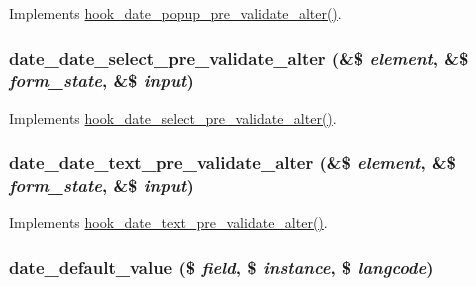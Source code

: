\label{date__elements_8inc_a955d565e21db7029f550ce0f35bda5d2}
Implements \hyperlink{date_8api_8php_ae85363c63f938c6742a67b315e925730}{hook\_\-date\_\-popup\_\-pre\_\-validate\_\-alter()}. \hypertarget{date__elements_8inc_a526cbfd5a13f0cf7c0f4fcc36fb174cc}{
\subsubsection[{date\_\-date\_\-select\_\-pre\_\-validate\_\-alter}]{\setlength{\rightskip}{0pt plus 5cm}date\_\-date\_\-select\_\-pre\_\-validate\_\-alter (\&\$ {\em element}, \/  \&\$ {\em form\_\-state}, \/  \&\$ {\em input})}}
\label{date__elements_8inc_a526cbfd5a13f0cf7c0f4fcc36fb174cc}
Implements \hyperlink{date_8api_8php_a8fa3364916ca73163501f3b9fa319dd6}{hook\_\-date\_\-select\_\-pre\_\-validate\_\-alter()}. \hypertarget{date__elements_8inc_ab74eeed6b68ddd639f767a6973725f6b}{
\subsubsection[{date\_\-date\_\-text\_\-pre\_\-validate\_\-alter}]{\setlength{\rightskip}{0pt plus 5cm}date\_\-date\_\-text\_\-pre\_\-validate\_\-alter (\&\$ {\em element}, \/  \&\$ {\em form\_\-state}, \/  \&\$ {\em input})}}
\label{date__elements_8inc_ab74eeed6b68ddd639f767a6973725f6b}
Implements \hyperlink{date_8api_8php_a2fc6fc0b5b0092304084ce3ce29741ae}{hook\_\-date\_\-text\_\-pre\_\-validate\_\-alter()}. \hypertarget{date__elements_8inc_aa01d96bc4c74fb8c7f8c2fc36d05d199}{
\subsubsection[{date\_\-default\_\-value}]{\setlength{\rightskip}{0pt plus 5cm}date\_\-default\_\-value (\$ {\em field}, \/  \$ {\em instance}, \/  \$ {\em langcode})}}
